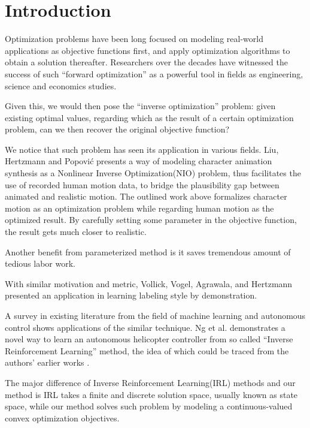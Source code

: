 \section{Introduction}\label{sec:introduction}

Optimization problems have been long focused on modeling real-world applications as objective functions first, and apply optimization algorithms to obtain a solution thereafter.
Researchers over the decades have witnessed the success of such ``forward optimization'' as a powerful tool in fields as engineering, science and economics studies.

Given this, we would then pose the ``inverse optimization'' problem: given existing optimal values, regarding which as the result of a certain optimization problem, can we then recover the original objective function?

We notice that such problem has seen its application in various fields.
Liu, Hertzmann and Popovi\'{c} \cite{Liu:2005:LPM} presents a way of modeling character animation synthesis as a Nonlinear Inverse Optimization(NIO) problem, thus facilitates the use of recorded human motion data, to bridge the plausibility gap between animated and realistic motion.
The outlined work above formalizes character motion as an optimization problem while regarding human motion as the optimized result. By carefully setting some parameter in the objective function, the result gets much closer to realistic.

Another benefit from parameterized method is it saves tremendous amount of tedious labor work.

With similar motivation and metric, Vollick, Vogel, Agrawala, and Hertzmann \cite{Vollick:2007:SLL} presented an application in learning labeling style by demonstration.

A survey in existing literature from the field of machine learning and autonomous control shows applications of the similar technique.
Ng et al. \cite{Coates:2009:ALH} demonstrates a novel way to learn an autonomous helicopter controller from so called ``Inverse Reinforcement Learning'' method, the idea of which could be traced from the authors' earlier works \cite{Ng:2000:AIR}.

The major difference of Inverse Reinforcement Learning(IRL) methods and our method is IRL takes a finite and discrete solution space, usually known as state space, while our method solves such problem by modeling a continuous-valued convex optimization objectives.

